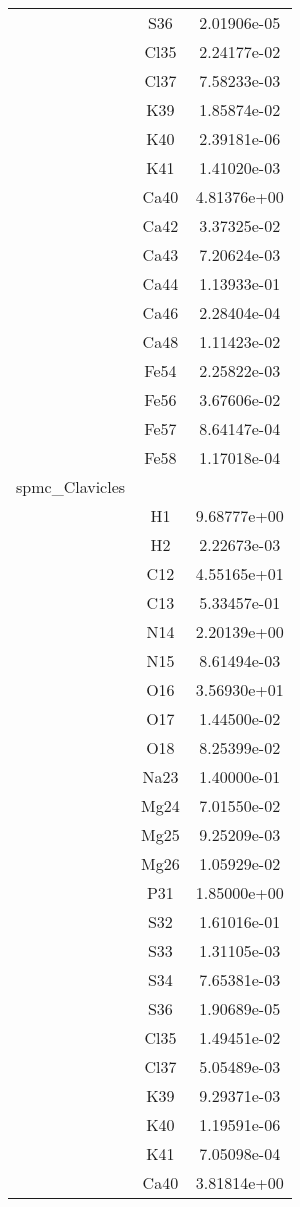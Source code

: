 \begin{centering}
\begin{longtable}{l c c}
& S36 & 2.01906e-05 \\ 
& Cl35 & 2.24177e-02 \\ 
& Cl37 & 7.58233e-03 \\ 
& K39 & 1.85874e-02 \\ 
& K40 & 2.39181e-06 \\ 
& K41 & 1.41020e-03 \\ 
& Ca40 & 4.81376e+00 \\ 
& Ca42 & 3.37325e-02 \\ 
& Ca43 & 7.20624e-03 \\ 
& Ca44 & 1.13933e-01 \\ 
& Ca46 & 2.28404e-04 \\ 
& Ca48 & 1.11423e-02 \\ 
& Fe54 & 2.25822e-03 \\ 
& Fe56 & 3.67606e-02 \\ 
& Fe57 & 8.64147e-04 \\ 
& Fe58 & 1.17018e-04 \\ 
\hline
spmc\_Clavicles & & \\
\hline
& H1 & 9.68777e+00 \\ 
& H2 & 2.22673e-03 \\ 
& C12 & 4.55165e+01 \\ 
& C13 & 5.33457e-01 \\ 
& N14 & 2.20139e+00 \\ 
& N15 & 8.61494e-03 \\ 
& O16 & 3.56930e+01 \\ 
& O17 & 1.44500e-02 \\ 
& O18 & 8.25399e-02 \\ 
& Na23 & 1.40000e-01 \\ 
& Mg24 & 7.01550e-02 \\ 
& Mg25 & 9.25209e-03 \\ 
& Mg26 & 1.05929e-02 \\ 
& P31 & 1.85000e+00 \\ 
& S32 & 1.61016e-01 \\ 
& S33 & 1.31105e-03 \\ 
& S34 & 7.65381e-03 \\ 
& S36 & 1.90689e-05 \\ 
& Cl35 & 1.49451e-02 \\ 
& Cl37 & 5.05489e-03 \\ 
& K39 & 9.29371e-03 \\ 
& K40 & 1.19591e-06 \\ 
& K41 & 7.05098e-04 \\ 
& Ca40 & 3.81814e+00 \\ 

\end{longtable}
\end{centering}
